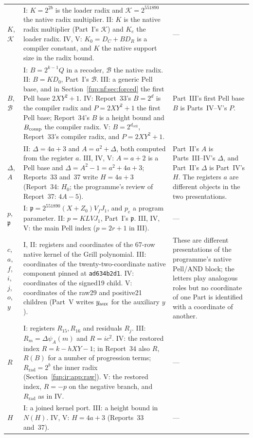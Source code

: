 \documentclass[11pt,letterpaper]{article}
\theoremstyle{definition}\newtheorem{definition}[theorem]{Definition}
\theoremstyle{remark}\newtheorem{remark}[theorem]{Remark}
\newcommand{\dcell}{d_{\mathrm{cell}}}
\begin{document}
{\begin{longtable}{@{}p{}p{}p{}@{}}
$K$, $\mathcal K$ & I: $K=2^{2b}$ is the loader radix and $\mathcal K=2^{551890}$ the native radix multiplier. II: $K$ is the native radix multiplier (Part~I's $\mathcal K$) and $K_e$ the loader radix. IV, V: $K_0=D_C+BD_R$ is a compiler constant, and $K$ the native support size in the radix bound. & ---\\
$B$, $\mathcal B$ & I: $B=2^{k-1}Q$ in a recoder, $\mathcal B$ the native radix. II: $B=KD_0$, Part~I's $\mathcal B$. III: a generic Pell base, and in Section~\ref{fup:nf:sec:forced} the first Pell base $2XY^2+1$. IV: Report~33's $B=2^d$ is the compiler radix and $P=2XY^2+1$ the first Pell base; Report~34's $B$ is a height bound and $B_{\rm comp}$ the compiler radix. V: $B=2^{\dcell}$, Report~33's compiler radix, and $P=2XY^2+1$. & Part~III's first Pell base $B$ is Parts~IV--V's $P$.\\
$\Delta$, $A$ & II: $\Delta=4a+3$ and $A=a^2+\Delta$, both computed from the register $a$. III, IV, V: $A=a+2$ is a Pell base and $\Delta=A^2-1=a^2+4a+3$; Reports~33 and~37 write $H=4a+3$ (Report~34: $H_0$; the programme's review of Report~37: $4A-5$). & Part~II's $A$ is Parts~III--IV's $\Delta$, and Part~II's $\Delta$ is Part~IV's $H$. The registers $a$ are different objects in the two presentations.\\
$p$, $\mathfrak p$ & I: $\mathfrak p=2^{551890}(X+Z_0)V_fJ_1$, and $p_e$ a program parameter. II: $p=KLVJ_1$, Part~I's $\mathfrak p$. III, IV, V: the main Pell index ($p=2r+1$ in III). & ---\\
$c$, $a$, $f$, $i$, $j$, $o$, $y$ & I, II: registers and coordinates of the 67-row native kernel of the Grill polynomial. III: coordinates of the twenty-two-coordinate native component pinned at \texttt{ad634b2d1}. IV: coordinates of the signed19 child. V: coordinates of the raw29 and positive21 children (Part~V writes $y_{\mathrm{aux}}$ for the auxiliary $y$). & These are different presentations of the programme's native Pell/AND block; the letters play analogous roles but no coordinate of one Part is identified with a coordinate of another.\\
$R$ & I: registers $R_{15},R_{16}$ and residuals $R_j$. III: $R_m=\Delta\psi_A(m)$ and $R=ic^2$. IV: the restored index $R=k-hXY-1$; in Report~34 also $R$, $R(B)$ for a number of progression terms; $R_{\mathrm{rad}}=2^b$ the inner radix (Section~\ref{fup:ir:app:raw}). V: the restored index, $R=-p$ on the negative branch, and $R_{\mathrm{rad}}$ as in IV. & ---\\
$H$ & I: a joined kernel port. III: a height bound in $N(H)$. IV, V: $H=4a+3$ (Reports~33 and~37). & ---\\

\end{longtable}}
\end{document}
